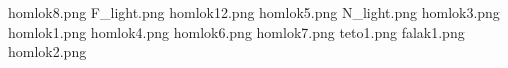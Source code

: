 homlok8.png
F_light.png
homlok12.png
homlok5.png
N_light.png
homlok3.png
homlok1.png
homlok4.png
homlok6.png
homlok7.png
teto1.png
falak1.png
homlok2.png

